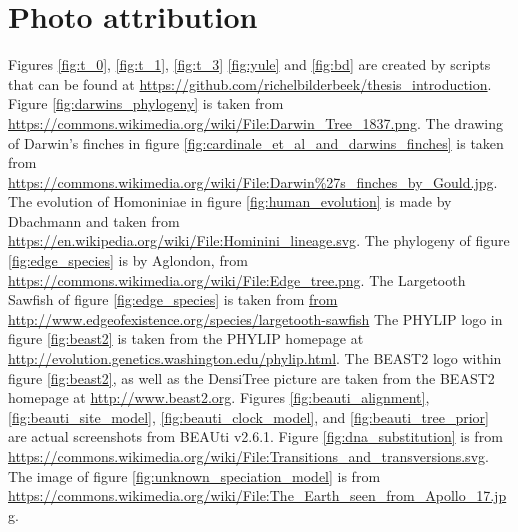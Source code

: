\section{Photo attribution}

\begin{sloppypar}
Figures \ref{fig:t_0}, \ref{fig:t_1}, \ref{fig:t_3} 
\ref{fig:yule} and \ref{fig:bd} are created by
scripts that can be found at \url{https://github.com/richelbilderbeek/thesis_introduction}.
Figure \ref{fig:darwins_phylogeny} is taken from \url{https://commons.wikimedia.org/wiki/File:Darwin_Tree_1837.png}.
The drawing of Darwin's finches in figure \ref{fig:cardinale_et_al_and_darwins_finches}
is taken from \url{https://commons.wikimedia.org/wiki/File:Darwin%27s_finches_by_Gould.jpg}.
The evolution of Homoniniae in figure \ref{fig:human_evolution} is made by Dbachmann 
and taken from \url{https://en.wikipedia.org/wiki/File:Hominini_lineage.svg}.
The phylogeny of figure \ref{fig:edge_species} 
is by Aglondon, from \url{https://commons.wikimedia.org/wiki/File:Edge_tree.png}.
The Largetooth Sawfish of figure \ref{fig:edge_species}
is taken from \url{from http://www.edgeofexistence.org/species/largetooth-sawfish}
The PHYLIP logo in figure \ref{fig:beast2} is taken from the PHYLIP homepage at \url{http://evolution.genetics.washington.edu/phylip.html}.
The BEAST2 logo within figure \ref{fig:beast2},
as well as the DensiTree picture are 
taken from the BEAST2 homepage at \url{http://www.beast2.org}.
Figures \ref{fig:beauti_alignment},
\ref{fig:beauti_site_model},
\ref{fig:beauti_clock_model},
and \ref{fig:beauti_tree_prior}
are actual screenshots from BEAUti v2.6.1.
Figure \ref{fig:dna_substitution} is from \url{https://commons.wikimedia.org/wiki/File:Transitions_and_transversions.svg}.
The image of figure \ref{fig:unknown_speciation_model}
is from \url{https://commons.wikimedia.org/wiki/File:The_Earth_seen_from_Apollo_17.jpg}.
\end{sloppypar}

